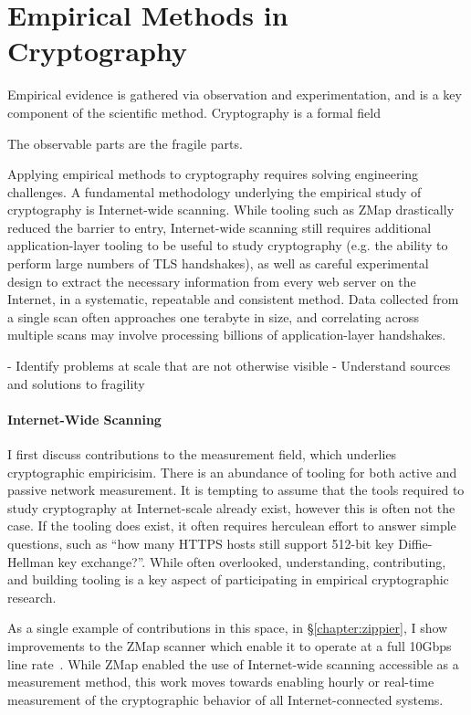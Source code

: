 \section{Empirical Methods in Cryptography}

Empirical evidence is gathered via observation and experimentation, and is a
key component of the scientific method. Cryptography is a formal field 

The observable parts are the fragile parts.

Applying empirical methods to cryptography requires solving engineering
challenges. A fundamental methodology underlying the empirical study of
cryptography is Internet-wide scanning. While tooling such as ZMap drastically
reduced the barrier to entry, Internet-wide scanning still requires additional
application-layer tooling to be useful to study cryptography (e.g. the ability
to perform large numbers of TLS handshakes), as well as careful experimental
design to extract the necessary information from every web server on the
Internet, in a systematic, repeatable and consistent method. Data collected
from a single scan often approaches one terabyte in size, and correlating
across multiple scans may involve processing billions of application-layer
handshakes.

- Identify problems at scale that are not otherwise visible
- Understand sources and solutions to fragility

\paragraph{Internet-Wide Scanning}

I first discuss contributions to the measurement field, which underlies
cryptographic empiricisim. There is an abundance of tooling for both active and
passive network measurement. It is tempting to assume that the tools required
to study cryptography at Internet-scale already exist, however this is often
not the case. If the tooling does exist, it often requires herculean effort to
answer simple questions, such as ``how many HTTPS hosts still support 512-bit
key Diffie-Hellman key exchange?''. While often overlooked, understanding,
contributing, and building tooling is a key aspect of participating in
empirical cryptographic research.

As a single example of contributions in this space, in \S\ref{chapter:zippier},
I show improvements to the ZMap scanner which enable it to operate at a full
10Gbps line rate~\cite{zippier-zmap-2014}.  While ZMap enabled the use of
Internet-wide scanning accessible as a measurement method, this work moves
towards enabling hourly or real-time measurement of the cryptographic behavior
of all Internet-connected systems.

